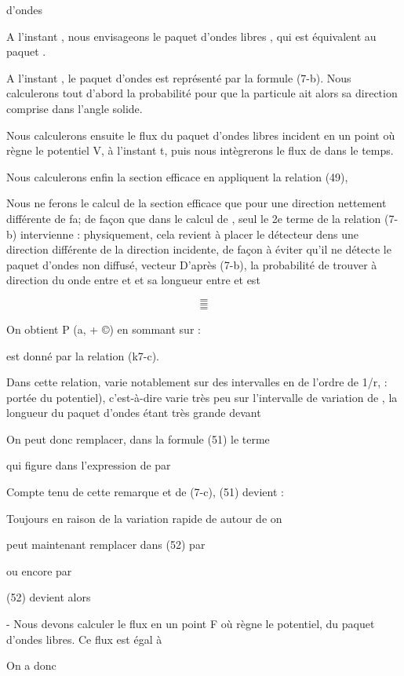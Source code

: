 {{{d'ondes

A l'instant  , nous envisageons le paquet d'ondes libres , qui est équivalent au paquet .

A l'instant  , le paquet d'ondes est représenté par la
formule (7-b). Nous calculerons tout d'abord la probabilité 
pour que la particule ait alors sa direction comprise dans l'angle solide.

Nous calculerons ensuite le flux du paquet d'ondes libres incident en un point où
règne le potentiel V, à l'instant t, puis nous intègrerons le flux de  dans le temps.

Nous calculerons enfin la section efficace en appliquent la relation (49),

Nous ne ferons le calcul de la section efficace que pour une direction  nettement
différente de fa; de façon que dans le calcul de
, seul le 2e terme de la relation (7-b) intervienne : physiquement,
cela revient à placer le détecteur dens une direction différente de la direction
incidente, de façon à éviter qu'il ne détecte le paquet d'ondes non diffusé,
vecteur D'après (7-b), la probabilité de trouver à  direction du
onde entre  et  et sa longueur entre  et  est


\[
\tag{51}=
\]
\[
\tag{52}=
\]
\[
\tag{53}=
\]

On obtient P (a, + ©) en sommant sur  :

  est donné par la relation (k7-c).

Dans cette relation, varie notablement sur des intervalles en  de l'ordre
de 1/r,  : portée du potentiel), c'est-à-dire
varie très peu sur l'intervalle de variation de , la longueur
du paquet d'ondes étant très grande devant 

On peut donc remplacer, dans la formule (51) le terme

 qui figure dans l'expression de  par

Compte tenu de cette remarque et de (7-c), (51) devient :

Toujours en raison de la variation rapide de  autour de  on

peut maintenant remplacer dans (52)  par

ou encore par

(52) devient alors


- Nous devons calculer le flux en un point F où règne le potentiel, du
paquet d'ondes libres. Ce flux  est égal à 

On a donc

}}}
